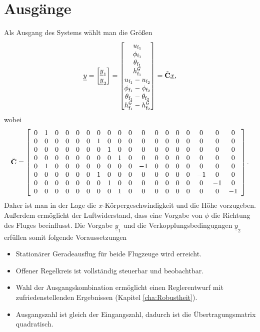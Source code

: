 \section{Ausgänge}
Als Ausgang des Systems wählt man die Grö{\ss}en
\begin{equation}
\underline{y} = \begin{bmatrix} \underline{y}_\mathrm{1}\\\underline{y}_\mathrm{2}  \end{bmatrix} = \begin{bmatrix} u_\mathrm{f_1}\\\phi_\mathrm{f_1}\\ \theta_\mathrm{f_1}\\ h^\mathcal{G}_\mathrm{f_1}\\u_\mathrm{f_1}-u_\mathrm{f_2}\\ \phi_\mathrm{f_1} -\phi_\mathrm{f_2}\\\theta_\mathrm{f_1}-\theta_\mathrm{f_2}\\ h^\mathcal{G}_\mathrm{f_1} - h^\mathcal{G}_\mathrm{f_2} \end{bmatrix} = \Tilde{\textbf{C}}\underline{x},
\end{equation}
wobei
\begin{equation}
 \Tilde{\textbf{C}} =  \left[\begin{array}{cccccccccccccccccc} 0 & 1 & 0 & 0 & 0 & 0 & 0 & 0 & 0 & 0 & 0 & 0 & 0 & 0 & 0 & 0 & 0 & 0\\ 0 & 0 & 0 & 0 & 0 & 0 & 1 & 0 & 0 & 0 & 0 & 0 & 0 & 0 & 0 & 0 & 0 & 0\\ 0 & 0 & 0 & 0 & 0 & 0 & 0 & 1 & 0 & 0 & 0 & 0 & 0 & 0 & 0 & 0 & 0 & 0\\ 0 & 0 & 0 & 0 & 0 & 0 & 0 & 0 & 1 & 0 & 0 & 0 & 0 & 0 & 0 & 0 & 0 & 0\\ 0 & 1 & 0 & 0 & 0 & 0 & 0 & 0 & 0 & 0 & -1 & 0 & 0 & 0 & 0 & 0 & 0 & 0\\ 0 & 0 & 0 & 0 & 0 & 0 & 1 & 0 & 0 & 0 & 0 & 0 & 0 & 0 & 0 & -1 & 0 & 0\\ 0 & 0 & 0 & 0 & 0 & 0 & 0 & 1 & 0 & 0 & 0 & 0 & 0 & 0 & 0 & 0 & -1 & 0\\ 0 & 0 & 0 & 0 & 0 & 0 & 0 & 0 & 1 & 0 & 0 & 0 & 0 & 0 & 0 & 0 & 0 & -1 \end{array}\right].
\end{equation}
\newline
Daher ist man in der Lage die $x$-Körpergeschwindigkeit und die Höhe vorzugeben. Außerdem ermöglicht der Luftwiderstand, dass eine Vorgabe von $\phi$ die Richtung des Fluges beeinflusst.  Die Vorgabe $\underline{y}_\mathrm{1}$ und die Verkopplungsbedingugngen $\underline{y}_\mathrm{2}$ erfüllen somit folgende Voraussetzungen
\begin{itemize}
\item Stationärer Geradeausflug für beide Flugzeuge wird erreicht.
\item Offener Regelkreis ist vollständig steuerbar und beobachtbar.
\item Wahl der Ausgangskombination ermöglicht einen Reglerentwurf mit zufriedenstellenden Ergebnissen (Kapitel \ref{cha:Robustheit}).
\item Ausgangszahl ist gleich der Eingangszahl, dadurch ist die Übertragungsmatrix quadratisch.
\end{itemize}
